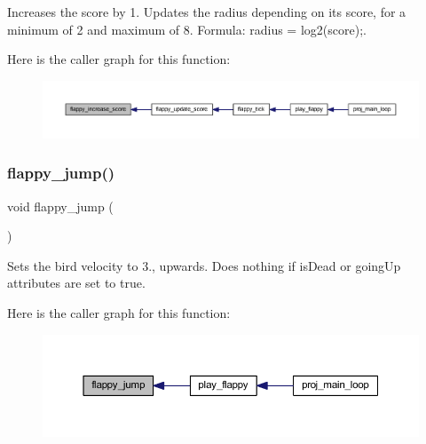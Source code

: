 Increases the score by 1. Updates the radius depending on its score, for a minimum of 2 and maximum of 8. Formula\+: radius = log2(score);. 

Here is the caller graph for this function\+:\nopagebreak
\begin{figure}[H]
\begin{center}
\leavevmode
\includegraphics[width=350pt]{group__flappy_gadf33bb76c8456ea822eb71ecc5325ee3_icgraph}
\end{center}
\end{figure}
\mbox{\label{group__flappy_ga204fac24b177bdc6293d3284fab9d771}} 
\subsubsection{\texorpdfstring{flappy\+\_\+jump()}{flappy\_jump()}}
{\footnotesize\ttfamily void flappy\+\_\+jump (\begin{DoxyParamCaption}{ }\end{DoxyParamCaption})}



Sets the bird velocity to 3., upwards. Does nothing if is\+Dead or going\+Up attributes are set to true. 

Here is the caller graph for this function\+:\nopagebreak
\begin{figure}[H]
\begin{center}
\leavevmode
\includegraphics[width=350pt]{group__flappy_ga204fac24b177bdc6293d3284fab9d771_icgraph}
\end{center}
\end{figure}
\mbox{\label{group__flappy_ga92fa31f2712c1d2f899246a5fd5913ab}} 

